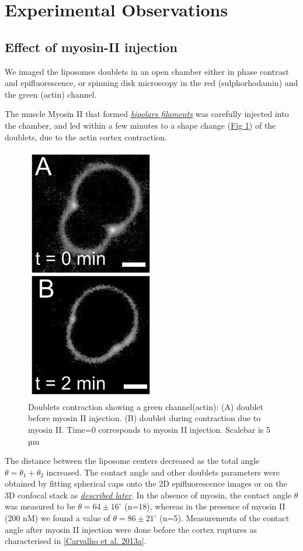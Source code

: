\documentclass[A4paperpaper,11pt,english]{sphinxmanual}
\begin{document}
\section{Experimental Observations}
\label{index-latex:experimental-observations}

\subsection{Effect of myosin-II injection}
\label{index-latex:effect-of-myosin-ii-injection}
We imaged the liposomes doublets in an open chamber either in phase contrast
and epifluorescence, or spinning disk microscopy in the red (sulphorhodamin)
and the green (actin) channel.

The muscle Myosin II that formed {\hyperref[index-latex:myoii]{\emph{bipolars filaments}}} was carefully injected into
the chamber, and led within a few minutes to a shape change (\hyperref[index-latex:doublets-contraction]{Fig  \ref*{index-latex:doublets-contraction}})
of the doublets, due to the actin cortex contraction.
\begin{figure}[htbp]
\centering
\capstart

\includegraphics[width=0.300\linewidth]{doublet-contract.png}
\caption{Doublets contraction showing a green channel(actin): (A) doublet before
myosin II injection. (B) doublet during contraction due to myosin II. Time=0 corresponds to myosin II injection.
Scalebar is 5 µm}\label{index-latex:doublets-contraction}\end{figure}

The distance between the liposome centers decreased as the total angle \(\theta
= \theta_1+\theta_2\) increased. The contact angle and other doublets parameters were obtained by fitting spherical caps onto the 2D epifluorescence
images or on the 3D confocal stack as {\hyperref[index-latex:full3dfit]{\emph{described later}}}.  In the absence of myosin, the
contact angle \(\theta\) was measured to be \(\theta = 64 \pm 16 ^{\circ}\) (n=18), whereas in
the presence of myosin II (200 nM) we found  a value of \(\theta = 86 \pm 21
^{\circ}\) (n=5). Measurements of the contact angle after myosin II injection were done before the cortex
ruptures as characterised in {\hyperref[index-latex:carvalho2013a]{{[}Carvalho et al. 2013a{]}}}.
\end{document}
